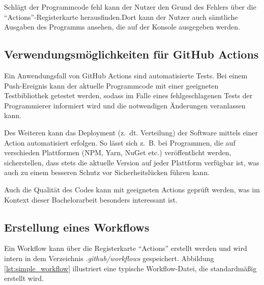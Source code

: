 Schlägt der Programmcode fehl kann der Nutzer den Grund des Fehlers über die  \enquote{Actions}-Registerkarte herausfinden.Dort kann der Nutzer auch sämtliche Ausgaben des Programms ansehen, die auf der Konsole ausgegeben werden.
\subsection{Verwendungsmöglichkeiten für GitHub Actions}

Ein Anwendungsfall von GitHub Actions sind automatisierte Tests. Bei einem Push-Ereignis kann der aktuelle Programmcode mit einer geeigneten Testbibliothek getestet werden, sodass im Falle eines fehlgeschlagenen Tests der Programmierer informiert wird und die notwendigen Änderungen veranlassen kann.

Des Weiteren kann das Deployment (z.~dt. Verteilung) der Software mittels einer Action automatisiert erfolgen. So lässt sich z.~B. bei Programmen, die auf verschieden Plattformen (NPM, Yarn, NuGet etc.)  veröffentlicht werden, sicherstellen, dass stets die aktuelle Version auf jeder Plattform verfügbar ist, was auch zu einem besseren Schutz vor Sicherheitslücken führen kann. 

Auch die Qualität des Codes kann mit geeigneten Actions geprüft werden, was im Kontext dieser Bachelorarbeit besonders interessant ist.  



\subsection{Erstellung eines Workflows}
Ein Workflow kann über die Registerkarte \enquote{Actions} erstellt werden und wird intern in dem Verzeichnis \textit{.github/workflows} gespeichert. Abbildung \ref{lst:simple_workflow} illustriert eine typische Workflow-Datei, die standardmäßig erstellt wird.


